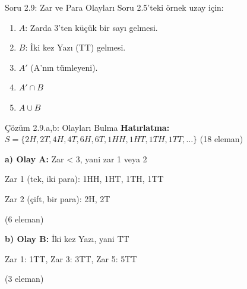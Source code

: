 \documentclass[light]{lutbeamer}
\begin{document}
\begin{frame}{Soru 2.9: Zar ve Para Olayları}
    Soru 2.5'teki örnek uzay için:
    \begin{enumerate}
        \item $A$: Zarda 3'ten küçük bir sayı gelmesi.
        \item $B$: İki kez Yazı (TT) gelmesi.
        \item $A'$ (A'nın tümleyeni).
        \item $A' \cap B$
        \item $A \cup B$
    \end{enumerate}
\end{frame}

\begin{frame}{Çözüm 2.9.a,b: Olayları Bulma}
    \color{blue}
    \textbf{Hatırlatma:} $S = \{2H, 2T, 4H, 4T, 6H, 6T, 1HH, 1HT, 1TH, 1TT, \ldots\}$ (18 eleman)
    
    \vspace{0.3cm}
    \textbf{a) Olay A:} Zar < 3, yani zar 1 veya 2
    
    Zar 1 (tek, iki para): 1HH, 1HT, 1TH, 1TT
    
    Zar 2 (çift, bir para): 2H, 2T
    
    \begin{center}
     (6 eleman)
    \end{center}
    
    \vspace{0.3cm}
    \textbf{b) Olay B:} İki kez Yazı, yani TT
    
    Zar 1: 1TT, Zar 3: 3TT, Zar 5: 5TT
    
    \begin{center}
     (3 eleman)
    \end{center}
\end{frame}
\end{document}
